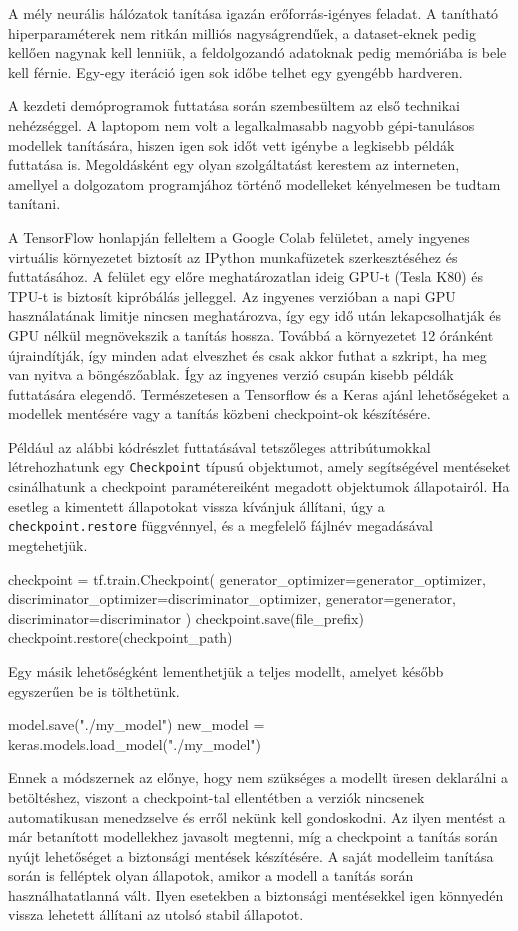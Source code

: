 
A mély neurális hálózatok tanítása igazán erőforrás-igényes feladat. A tanítható hiperparaméterek nem ritkán milliós nagyságrendűek, a dataset-eknek pedig kellően nagynak kell lenniük, a feldolgozandó adatoknak pedig memóriába is bele kell férnie. Egy-egy iteráció igen sok időbe telhet egy gyengébb hardveren.

A kezdeti demóprogramok futtatása során szembesültem az első technikai nehézséggel. A laptopom nem volt a legalkalmasabb nagyobb gépi-tanulásos modellek tanítására, hiszen igen sok időt vett igénybe a legkisebb példák futtatása is. Megoldásként egy olyan szolgáltatást kerestem az interneten, amellyel a dolgozatom programjához történő modelleket kényelmesen be tudtam tanítani.

A TensorFlow honlapján felleltem a Google Colab \cite{colab} felületet, amely ingyenes virtuális környezetet biztosít az IPython munkafüzetek szerkesztéséhez és futtatásához. A felület egy előre meghatározatlan ideig GPU-t (Tesla K80) és TPU-t is biztosít kipróbálás jelleggel. Az ingyenes verzióban a napi GPU használatának limitje nincsen meghatározva, így egy idő után lekapcsolhatják és GPU nélkül megnövekszik a tanítás hossza. Továbbá a környezetet 12 óránként újraindítják, így minden adat elveszhet és csak akkor futhat a szkript, ha meg van nyitva a böngészőablak. Így az ingyenes verzió csupán kisebb példák futtatására elegendő. Természetesen a Tensorflow és a Keras ajánl lehetőségeket a modellek mentésére vagy a tanítás közbeni checkpoint-ok készítésére.

Például az alábbi kódrészlet futtatásával tetszőleges attribútumokkal létrehozhatunk egy \texttt{Checkpoint} típusú objektumot, amely segítségével mentéseket csinálhatunk a checkpoint paramétereiként megadott objektumok állapotairól. Ha esetleg a kimentett állapotokat vissza kívánjuk állítani, úgy a \texttt{checkpoint.restore} függvénnyel, és a megfelelő fájlnév megadásával megtehetjük.
\newpage
\begin{python}
checkpoint = tf.train.Checkpoint(
    generator_optimizer=generator_optimizer,
    discriminator_optimizer=discriminator_optimizer,
    generator=generator,
    discriminator=discriminator
)
checkpoint.save(file_prefix)
checkpoint.restore(checkpoint_path)
\end{python}

Egy másik lehetőségként lementhetjük a teljes modellt, amelyet később egyszerűen be is tölthetünk.
\begin{python}
model.save("./my_model")
new_model = keras.models.load_model("./my_model")
\end{python}
Ennek a módszernek az előnye, hogy nem szükséges a modellt üresen deklarálni a betöltéshez, viszont a checkpoint-tal ellentétben a verziók nincsenek automatikusan menedzselve és erről nekünk kell gondoskodni. Az ilyen mentést a már betanított modellekhez javasolt megtenni, míg a checkpoint a tanítás során nyújt lehetőséget a biztonsági mentések készítésére. A saját modelleim tanítása során is felléptek olyan állapotok, amikor a modell a tanítás során használhatatlanná vált. Ilyen esetekben a biztonsági mentésekkel igen könnyedén vissza lehetett állítani az utolsó stabil állapotot.

